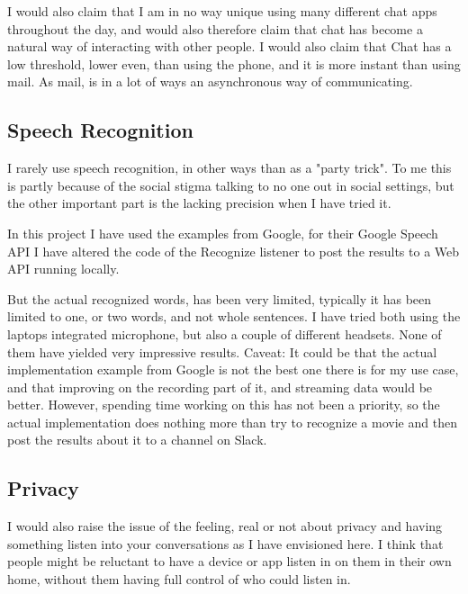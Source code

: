 \documentclass[11pt,fleqn]{book} %
\begin{document}
I would also claim that I am in no way unique using many different chat apps throughout the day, and would also therefore claim that chat has become a natural way of interacting with other people.
I would also claim that Chat has a low threshold, lower even, than using the phone, and it is more instant than using mail. As mail, is in a lot of ways an asynchronous way of communicating.

\subsection{Speech Recognition}
I rarely use speech recognition, in other ways than as a "party trick". To me this is partly because of the social stigma talking to no one out in social settings, but the other important part is the lacking precision when I have tried it.

In this project I have used the examples from Google, for their Google Speech API
\cite{GoogleCloudPlatformSpeechPlatform}
I have altered the code of the Recognize listener to post the results to a Web API running locally.

But the actual recognized words, has been very limited, typically it has been limited to one, or two words, and not whole sentences.
I have tried both using the laptops integrated microphone, but also a couple of different headsets. None of them have yielded very impressive results.
Caveat: It could be that the actual implementation example from Google is not the best one there is for my use case, and that improving on the recording part of it, and streaming data would be better. However, spending time working on this has not been a priority, so the actual implementation does nothing more than try to recognize a movie and then post the results about it to a channel on Slack.
\subsection{Privacy}
I would also raise the issue of the feeling, real or not about privacy and having something listen into your conversations as I have envisioned here. I think that people might be reluctant to have a device or app listen in on them in their own home, without them having full control of who could listen in.

\end{document}
